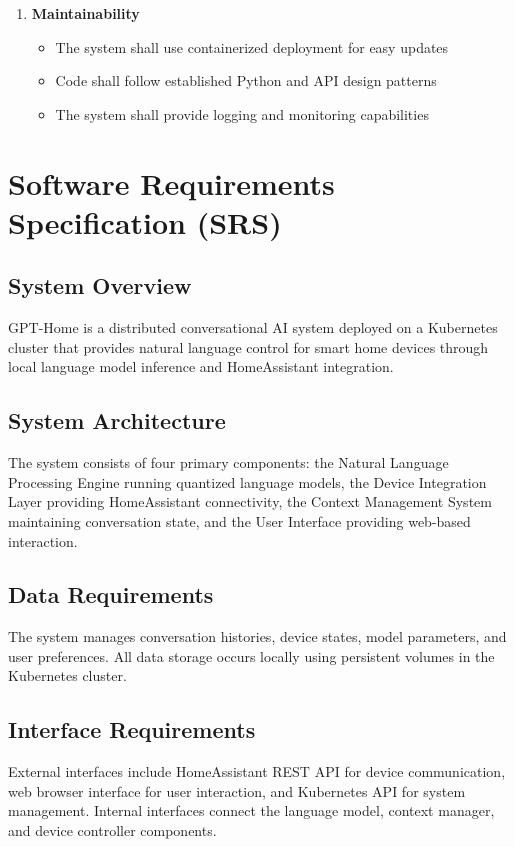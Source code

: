 \documentclass[12pt]{article}
\begin{document}
\begin{enumerate}[label=NFR-\arabic*]
\item \textbf{Maintainability}
    \begin{itemize}
    \item The system shall use containerized deployment for easy updates
    \item Code shall follow established Python and API design patterns
    \item The system shall provide logging and monitoring capabilities
    \end{itemize}
\end{enumerate}

\section{Software Requirements Specification (SRS)}

\subsection{System Overview}
GPT-Home is a distributed conversational AI system deployed on a Kubernetes cluster that provides natural language control for smart home devices through local language model inference and HomeAssistant integration.

\subsection{System Architecture}
The system consists of four primary components: the Natural Language Processing Engine running quantized language models, the Device Integration Layer providing HomeAssistant connectivity, the Context Management System maintaining conversation state, and the User Interface providing web-based interaction.

\subsection{Data Requirements}
The system manages conversation histories, device states, model parameters, and user preferences. All data storage occurs locally using persistent volumes in the Kubernetes cluster.

\subsection{Interface Requirements}
External interfaces include HomeAssistant REST API for device communication, web browser interface for user interaction, and Kubernetes API for system management. Internal interfaces connect the language model, context manager, and device controller components.
\end{document}
